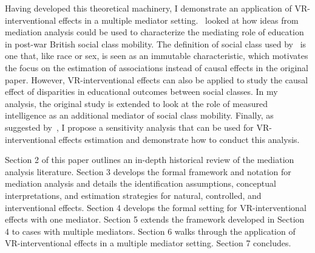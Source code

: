 \documentclass[11pt]{article} %
\numberwithin{equation}{section} %
\begin{document}
Having developed this theoretical machinery, I demonstrate an application of VR-interventional effects in a multiple mediator setting.~\cite{kuhaetal2021} looked at how ideas from mediation analysis could be used to characterize the mediating role of education in post-war British social class mobility. The definition of social class used by~\cite{kuhaetal2021} is one that, like race or sex, is seen as an immutable characteristic, which motivates the focus on the estimation of associations instead of causal effects in the original paper. However, VR-interventional effects can also be applied to study the causal effect of disparities in educational outcomes between social classes. In my analysis, the original study is extended to look at the role of measured intelligence as an additional mediator of social class mobility. Finally, as suggested by~\cite{jackson2021}, I propose a sensitivity analysis that can be used for VR-interventional effects estimation and demonstrate how to conduct this analysis.  

Section 2 of this paper outlines an in-depth historical review of the mediation analysis literature. Section 3 develops the formal framework and notation for mediation analysis and details the identification assumptions, conceptual interpretations, and estimation strategies for natural, controlled, and interventional effects. Section 4 develops the formal setting for VR-interventional effects with one mediator. Section 5 extends the framework developed in Section 4 to cases with multiple mediators. Section 6 walks through the application of VR-interventional effects in a multiple mediator setting. Section 7 concludes. 




\end{document}

